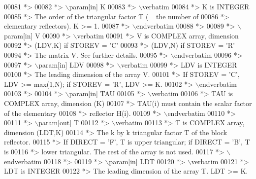 \begin{DoxyCode}
00081 \textcolor{comment}{*>}
00082 \textcolor{comment}{*> \(\backslash\)param[in] K}
00083 \textcolor{comment}{*> \(\backslash\)verbatim}
00084 \textcolor{comment}{*>          K is INTEGER}
00085 \textcolor{comment}{*>          The order of the triangular factor T (= the number of}
00086 \textcolor{comment}{*>          elementary reflectors). K >= 1.}
00087 \textcolor{comment}{*> \(\backslash\)endverbatim}
00088 \textcolor{comment}{*>}
00089 \textcolor{comment}{*> \(\backslash\)param[in] V}
00090 \textcolor{comment}{*> \(\backslash\)verbatim}
00091 \textcolor{comment}{*>          V is COMPLEX array, dimension}
00092 \textcolor{comment}{*>                               (LDV,K) if STOREV = 'C'}
00093 \textcolor{comment}{*>                               (LDV,N) if STOREV = 'R'}
00094 \textcolor{comment}{*>          The matrix V. See further details.}
00095 \textcolor{comment}{*> \(\backslash\)endverbatim}
00096 \textcolor{comment}{*>}
00097 \textcolor{comment}{*> \(\backslash\)param[in] LDV}
00098 \textcolor{comment}{*> \(\backslash\)verbatim}
00099 \textcolor{comment}{*>          LDV is INTEGER}
00100 \textcolor{comment}{*>          The leading dimension of the array V.}
00101 \textcolor{comment}{*>          If STOREV = 'C', LDV >= max(1,N); if STOREV = 'R', LDV >= K.}
00102 \textcolor{comment}{*> \(\backslash\)endverbatim}
00103 \textcolor{comment}{*>}
00104 \textcolor{comment}{*> \(\backslash\)param[in] TAU}
00105 \textcolor{comment}{*> \(\backslash\)verbatim}
00106 \textcolor{comment}{*>          TAU is COMPLEX array, dimension (K)}
00107 \textcolor{comment}{*>          TAU(i) must contain the scalar factor of the elementary}
00108 \textcolor{comment}{*>          reflector H(i).}
00109 \textcolor{comment}{*> \(\backslash\)endverbatim}
00110 \textcolor{comment}{*>}
00111 \textcolor{comment}{*> \(\backslash\)param[out] T}
00112 \textcolor{comment}{*> \(\backslash\)verbatim}
00113 \textcolor{comment}{*>          T is COMPLEX array, dimension (LDT,K)}
00114 \textcolor{comment}{*>          The k by k triangular factor T of the block reflector.}
00115 \textcolor{comment}{*>          If DIRECT = 'F', T is upper triangular; if DIRECT = 'B', T is}
00116 \textcolor{comment}{*>          lower triangular. The rest of the array is not used.}
00117 \textcolor{comment}{*> \(\backslash\)endverbatim}
00118 \textcolor{comment}{*>}
00119 \textcolor{comment}{*> \(\backslash\)param[in] LDT}
00120 \textcolor{comment}{*> \(\backslash\)verbatim}
00121 \textcolor{comment}{*>          LDT is INTEGER}
00122 \textcolor{comment}{*>          The leading dimension of the array T. LDT >= K.}

\end{DoxyCode}
